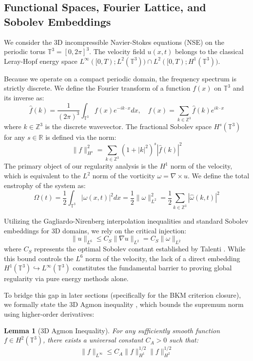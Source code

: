 \documentclass[12pt,a4paper]{article}
\theoremstyle{plain}
\newtheorem{lemma}[theorem]{Lemma}
\theoremstyle{definition}
\theoremstyle{remark}
\begin{document}
\subsection{Functional Spaces, Fourier Lattice, and Sobolev Embeddings}
We consider the 3D incompressible Navier-Stokes equations (NSE) on the periodic torus $\mathbb{T}^3 = [0, 2\pi]^3$. The velocity field $u(x,t)$ belongs to the classical Leray-Hopf energy space $L^\infty([0, T); L^2(\mathbb{T}^3)) \cap L^2([0, T); H^1(\mathbb{T}^3))$. 

Because we operate on a compact periodic domain, the frequency spectrum is strictly discrete. We define the Fourier transform of a function $f(x)$ on $\mathbb{T}^3$ and its inverse as:
\begin{equation}
    \hat{f}(k) = \frac{1}{(2\pi)^3} \int_{\mathbb{T}^3} f(x) e^{-i k \cdot x} dx, \quad f(x) = \sum_{k \in \mathbb{Z}^3} \hat{f}(k) e^{i k \cdot x}
\end{equation}
where $k \in \mathbb{Z}^3$ is the discrete wavevector. The fractional Sobolev space $H^s(\mathbb{T}^3)$ for any $s \in \mathbb{R}$ is defined via the norm:
\begin{equation}
    \|f\|_{H^s}^2 = \sum_{k \in \mathbb{Z}^3} (1 + |k|^2)^s |\hat{f}(k)|^2
\end{equation}
The primary object of our regularity analysis is the $H^1$ norm of the velocity, which is equivalent to the $L^2$ norm of the vorticity $\omega = \nabla \times u$. We define the total enstrophy of the system as:
\begin{equation}
    \Omega(t) = \frac{1}{2} \int_{\mathbb{T}^3} |\omega(x,t)|^2 dx = \frac{1}{2} \|\omega\|_{L^2}^2 = \frac{1}{2} \sum_{k \in \mathbb{Z}^3} |\hat{\omega}(k,t)|^2
\end{equation}

Utilizing the Gagliardo-Nirenberg interpolation inequalities and standard Sobolev embeddings for 3D domains, we rely on the critical injection:
\begin{equation}
    \|u\|_{L^6} \leq C_S \|\nabla u\|_{L^2} = C_S \|\omega\|_{L^2}
\end{equation}
where $C_S$ represents the optimal Sobolev constant established by Talenti \cite{talenti1976}. While this bound controls the $L^6$ norm of the velocity, the lack of a direct embedding $H^1(\mathbb{T}^3) \hookrightarrow L^\infty(\mathbb{T}^3)$ constitutes the fundamental barrier to proving global regularity via pure energy methods alone. 

To bridge this gap in later sections (specifically for the BKM criterion closure), we formally state the 3D Agmon inequality \cite{agmon1965}, which bounds the supremum norm using higher-order derivatives:
\begin{lemma}[3D Agmon Inequality]\label{lem:agmon}
For any sufficiently smooth function $f \in H^2(\mathbb{T}^3)$, there exists a universal constant $C_A > 0$ such that:
\begin{equation}
    \|f\|_{L^\infty} \leq C_A \|f\|_{H^1}^{1/2} \|f\|_{H^2}^{1/2}
\end{equation}
\end{lemma}
\end{document}
